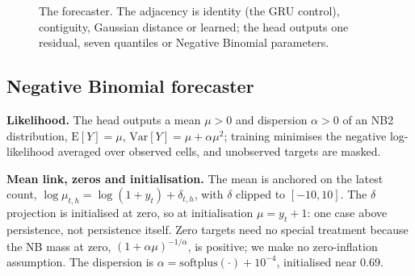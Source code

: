 \begin{figure}[t]
\centering
{}
\caption{The forecaster. The adjacency is identity (the GRU control), contiguity, Gaussian distance or learned; the head outputs one residual, seven quantiles or Negative Binomial parameters.}
\label{fig:pipeline}
\end{figure}

\subsection{Negative Binomial forecaster}
\label{sec:nb}
\textbf{Likelihood.} The head outputs a mean $\mu>0$ and dispersion $\alpha>0$ of an NB2 distribution, $\mathrm{E}[Y]=\mu$, $\mathrm{Var}[Y]=\mu+\alpha\mu^2$; training minimises the negative log-likelihood averaged over observed cells, and unobserved targets are masked.

\textbf{Mean link, zeros and initialisation.} The mean is anchored on the latest count, $\log\mu_{t,h}=\log(1+y_t)+\delta_{t,h}$, with $\delta$ clipped to $[-10,10]$. The $\delta$ projection is initialised at zero, so at initialisation $\mu=y_t+1$: one case above persistence, not persistence itself. Zero targets need no special treatment because the NB mass at zero, $(1+\alpha\mu)^{-1/\alpha}$, is positive; we make no zero-inflation assumption. The dispersion is $\alpha=\mathrm{softplus}(\cdot)+10^{-4}$, initialised near 0.69.


